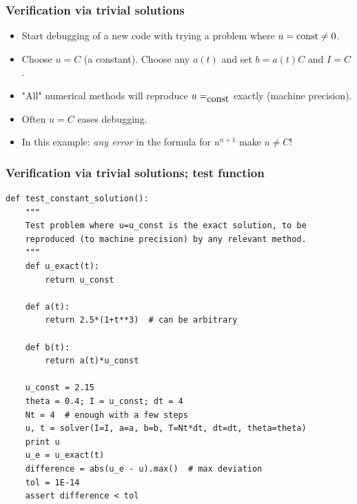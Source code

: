 \documentclass{beamer}
\begin{document}
\begin{frame}
\frametitle{Verification via trivial solutions}

\label{decay:verify:trivial}

\begin{itemize}
 \item Start debugging of a new code with trying a problem
   where $u=\hbox{const} \neq 0$.

 \item Choose $u=C$ (a constant). Choose any $a(t)$ and set
   $b=a(t)C$ and
   $I=C$.

 \item "All" numerical methods will reproduce $u=_{\hbox{const}}$
   exactly (machine precision).

 \item Often $u=C$ eases debugging.

 \item In this example: \emph{any error} in the formula for $u^{n+1}$
   make $u\neq C$!
\end{itemize}

\noindent
\end{frame}

\begin{frame}
\frametitle{Verification via trivial solutions; test function}

\begin{verbatim}
def test_constant_solution():
    """
    Test problem where u=u_const is the exact solution, to be
    reproduced (to machine precision) by any relevant method.
    """
    def u_exact(t):
        return u_const

    def a(t):
        return 2.5*(1+t**3)  # can be arbitrary

    def b(t):
        return a(t)*u_const

    u_const = 2.15
    theta = 0.4; I = u_const; dt = 4
    Nt = 4  # enough with a few steps
    u, t = solver(I=I, a=a, b=b, T=Nt*dt, dt=dt, theta=theta)
    print u
    u_e = u_exact(t)
    difference = abs(u_e - u).max()  # max deviation
    tol = 1E-14
    assert difference < tol
\end{verbatim}
\end{frame}
\end{document}
